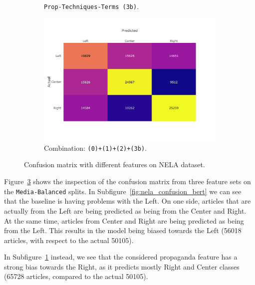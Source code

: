 \begin{figure}[!htbp]
\begin{subfigure}[b]{0.7\linewidth}
         \caption{\texttt{Prop-Techniques-Terms (3b)}.}
         \label{fig:nela_confusion_prop}
     \end{subfigure}
    \begin{subfigure}[b]{0.7\linewidth}
         \centering 
         \includegraphics[trim={0 2cm 2cm 1cm},clip,width=\linewidth]{figures/nela_allsides_subset_media_balanced_confusion_matrix_bert,propaganda_total_percentage,propaganda_percentages,propaganda_techniques_tf_idf.pdf}
         \caption{Combination: \texttt{(0)+(1)+(2)+(3b)}.}
         \label{fig:nela_confusion_combined}
     \end{subfigure}
    \caption{Confusion matrix with different features on NELA dataset.}
    \label{fig:nela_confusion}
\end{figure}

Figure~\ref{fig:nela_confusion} shows the inspection of the confusion matrix from three feature sets on the \texttt{Media-Balanced} splits.
In Subfigure~\ref{fig:nela_confusion_bert} we can see that the baseline is having problems with the Left.
On one side, articles that are actually from the Left are being predicted as being from the Center and Right.
At the same time, articles from Center and Right are being predicted as being from the Left. This results in the model being biased towards the Left (56018 articles, with respect to the actual 50105).

In Subfigure~\ref{fig:nela_confusion_prop} instead, we see that the considered propaganda feature has a strong bias towards the Right, as it predicts mostly Right and Center classes (65728 articles, compared to the actual 50105).

